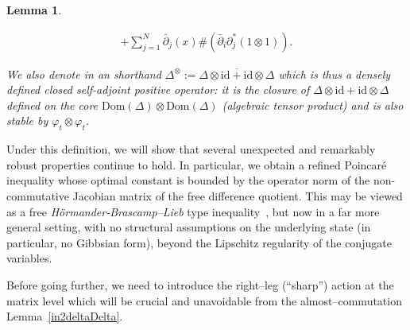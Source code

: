 \documentclass[10pt,a4paper,reqno]{amsart}
\newtheorem{lemma}[theorem]{Lemma}
\def\o{\omega}
\newcommand{\Dom}{\mathrm{Dom}}
\begin{document}
\begin{lemma}
\begin{enumerate}
\begin{align*}
+\sum_{j=1}^N\bar{\partial}_{j}(x)\#(\bar{\partial}_{i}\partial_{j}^{*}(1\otimes 1) ).
\end{align*}
\end{enumerate}
We also denote in an shorthand $\Delta^{\otimes}:=\overline{\Delta\otimes \mathrm{id}+\mathrm{id}\otimes \Delta}$ which
 is thus a densely defined closed self-adjoint positive operator: it is the closure of $\Delta\otimes \mathrm{id}+\mathrm{id}\otimes \Delta$ defined on the core $\Dom(\Delta)\otimes \Dom(\Delta)$  (algebraic tensor product) and is also stable by $\varphi_t\otimes \varphi_t$.
\end{lemma}


\begin{flushleft}
Under this definition, we will show that several unexpected and remarkably robust properties continue to hold. In particular, we obtain a refined Poincar\'e inequality whose optimal constant is bounded by the operator norm of the non-commutative Jacobian matrix of the free difference quotient. This may be viewed as a free \emph{H\"ormander-Brascamp--Lieb} type inequality~\cite{Brascamp}, but now in a far more general setting, with no structural assumptions on the underlying state (in particular, no Gibbsian form), beyond the Lipschitz regularity of the conjugate variables.
\end{flushleft}
\begin{flushleft}
Before going further, we need to introduce the right--leg (``sharp'') action at the matrix level which will be crucial and unavoidable from the almost--commutation Lemma~\ref{in2deltaDelta}.
\end{flushleft}
\end{document}
